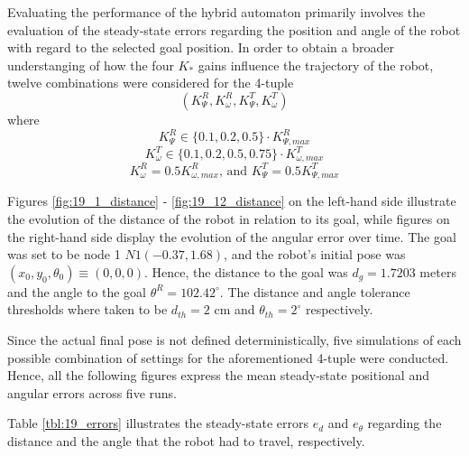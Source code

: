 Evaluating the performance of the hybrid automaton primarily involves the
evaluation of the steady-state errors regarding the position and angle of the
robot with regard to the selected goal position. In order to obtain a broader
understanging of how the four $K_{*}$ gains influence the trajectory of the
robot, twelve combinations were considered for the 4-tuple
$$(K_{\Psi}^R, K_{\omega}^R, K_{\Psi}^T, K_{\omega}^T)$$
where
$$K_{\Psi}^R \in \{0.1,0.2,0.5\} \cdot K_{\Psi,max}^R$$
$$K_{\omega}^T \in \{0.1,0.2,0.5,0.75\} \cdot K_{\omega,max}^T$$
$$K_{\omega}^R = 0.5 K_{\omega,max}^R \text{, and } K_{\Psi}^T = 0.5 K_{\Psi,max}^T$$


Figures \ref{fig:19_1_distance} - \ref{fig:19_12_distance} on the left-hand side
illustrate the evolution of the distance of the robot in relation to its goal,
while figures on the right-hand side display the evolution of the angular
error over time. The goal was set to be node 1 $N1(-0.37, 1.68)$, and the
robot's initial pose was $(x_0, y_0, \theta_0) \equiv (0,0,0)$. Hence, the
distance to the goal was $d_g = 1.7203$ meters and the angle to the goal
$\theta^R = 102.42^{\circ}$. The distance and angle tolerance thresholds where
taken to be $d_{th} = 2\text{ cm}$ and $\theta_{th} = 2^{\circ}$ respectively.

Since the actual final pose is not defined deterministically, five simulations
of each possible combination of settings for the aforementioned 4-tuple were
conducted.  Hence, all the following figures express the mean steady-state
positional and angular errors across five runs.

Table \ref{tbl:19_errors} illustrates the steady-state errors $e_d$ and
$e_{\theta}$ regarding the distance and the angle that the robot had to travel,
respectively.

\noindent{}

